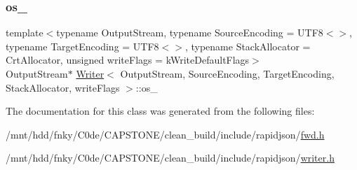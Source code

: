 \mbox{\label{classWriter_a3a3f60140f78dd67b5274978fd3a33ff}} 
\subsubsection{\texorpdfstring{os\+\_\+}{os\_}}
{\footnotesize\ttfamily template$<$typename Output\+Stream, typename Source\+Encoding = U\+T\+F8$<$$>$, typename Target\+Encoding = U\+T\+F8$<$$>$, typename Stack\+Allocator = Crt\+Allocator, unsigned write\+Flags = k\+Write\+Default\+Flags$>$ \\
Output\+Stream$\ast$ \hyperlink{classWriter}{Writer}$<$ Output\+Stream, Source\+Encoding, Target\+Encoding, Stack\+Allocator, write\+Flags $>$\+::os\+\_\+\hspace{0.3cm}{\ttfamily [protected]}}



The documentation for this class was generated from the following files\+:\begin{DoxyCompactItemize}
\item 
/mnt/hdd/fnky/\+C0de/\+C\+A\+P\+S\+T\+O\+N\+E/clean\+\_\+build/include/rapidjson/\hyperlink{fwd_8h}{fwd.\+h}\item 
/mnt/hdd/fnky/\+C0de/\+C\+A\+P\+S\+T\+O\+N\+E/clean\+\_\+build/include/rapidjson/\hyperlink{writer_8h}{writer.\+h}\end{DoxyCompactItemize}
